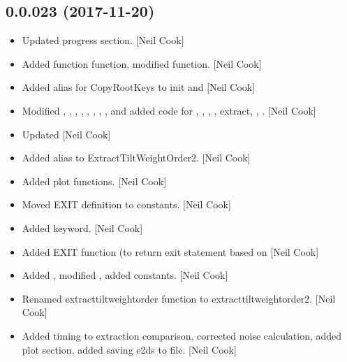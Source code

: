 \documentclass[a4paper,10pt,english]{report}
\begin{document}
\subsection{0.0.023 (2017-11-20)}
\label{\detokenize{misc/changelog:id529}}\begin{itemize}
\item {} 
Updated progress section. {[}Neil Cook{]}

\item {} 
Added function  function, modified  function.
{[}Neil Cook{]}

\item {} 
Added alias for CopyRootKeys to init and  {[}Neil Cook{]}

\item {} 
Modified , , ,
, ,
, ,
,  and
 added code for , ,
, , extract, ,
. {[}Neil Cook{]}

\item {} 
Updated  {[}Neil Cook{]}

\item {} 
Added alias to ExtractTiltWeightOrder2. {[}Neil Cook{]}

\item {} 
Added  plot functions. {[}Neil Cook{]}

\item {} 
Moved EXIT definition to constants. {[}Neil Cook{]}

\item {} 
Added  keyword. {[}Neil Cook{]}

\item {} 
Added EXIT function (to return exit statement based on 
{[}Neil Cook{]}

\item {} 
Added , modified , added
 constants. {[}Neil Cook{]}

\item {} 
Renamed extracttiltweightorder function to extracttiltweightorder2.
{[}Neil Cook{]}

\item {} 
Added timing to extraction comparison, corrected noise calculation,
added plot section, added saving e2ds to file. {[}Neil Cook{]}

\end{itemize}
\end{document}

